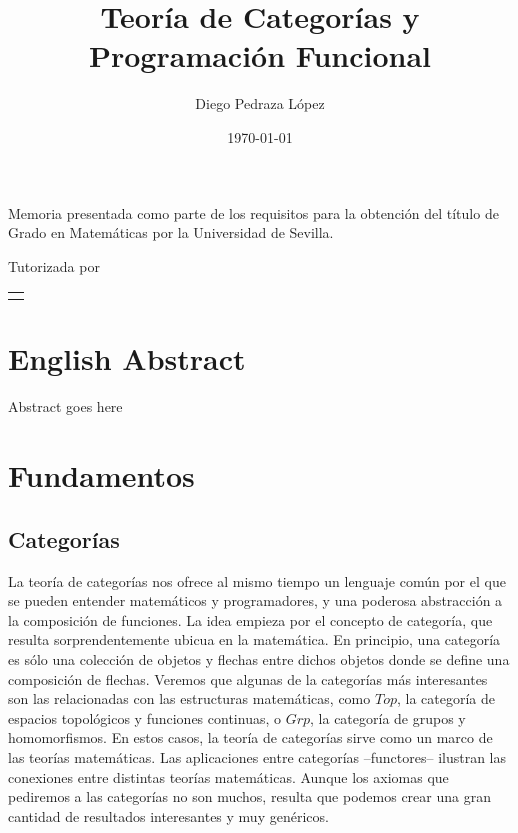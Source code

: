 \documentclass[12pt, twoside]{book}
\title{Teoría de Categorías y Programación Funcional}
\author{Diego Pedraza López}
\date{\today}
\makeatletter
\renewcommand\maketitle{%
  \begin{titlepage}
      \vspace*{1.5cm}
      \parskip=0pt
      \Huge\bfseries
      \begin{center}
          \@title
      \end{center}
      \vspace{1cm}
      \begin{center}
          \@author
      \end{center}
  \end{titlepage}

  \begin{titlepage}
  \parindent=0pt
  \begin{flushleft}
  \vspace*{1.5mm}
  \setlength\baselineskip{0pt}
  \setlength\parskip{0mm}
  \begin{center}
  \end{center}
  \end{flushleft}
  \vspace{1cm}
  \bgroup
  \Large \bfseries
  \begin{center}
  \@title
  \end{center}
  \egroup
  \vspace*{.5cm}
  \begin{center}
  \@author
  \end{center}
  \vspace*{1.8cm}
  \begin{flushright}
  \begin{minipage}{8.45cm}
      Memoria presentada como parte de los requisitos para la obtención del título de
      Grado en Matemáticas por la Universidad de Sevilla.

      \vspace*{7.5mm}

      Tutorizada por
  \end{minipage}\par
  \begin{tabularx}{8.45cm}[b]{@{}l}
      \guardatutores
  \end{tabularx}
   \end{flushright}
      \vspace*{\fill}
   \end{titlepage}
   \pagestyle{tfg}
   \renewcommand{\chaptermark}[1]{\markright{\thechapter.\space ##1}}
   \renewcommand{\sectionmark}[1]{}
   \renewcommand{\subsectionmark}[1]{}
  }
\newcommand{\Grp}{{Grp}}
\newcommand{\Top}{{Top}}
\makeatother
\begin{document}
\maketitle

\frontmatter
\tableofcontents

\mainmatter


\chapter*{English Abstract}

\begin{otherlanguage}{english}
    Abstract goes here
\end{otherlanguage}

\chapter{Fundamentos}

\section{Categorías}

La teoría de categorías nos ofrece al mismo tiempo un lenguaje común por el que se pueden entender matemáticos y programadores, y una poderosa abstracción a la composición de funciones.
La idea empieza por el concepto de categoría, que resulta sorprendentemente ubicua en la matemática.
En principio, una categoría es sólo una colección de objetos y flechas entre dichos objetos donde se define una composición de flechas.
Veremos que algunas de la categorías más interesantes son las relacionadas con las estructuras matemáticas, como $\Top$, la categoría de espacios topológicos y funciones continuas, o $\Grp$, la categoría de grupos y homomorfismos.
En estos casos, la teoría de categorías sirve como un marco de las teorías matemáticas.
Las aplicaciones entre categorías --functores-- ilustran las conexiones entre distintas teorías matemáticas.
Aunque los axiomas que pediremos a las categorías no son muchos, resulta que podemos crear una gran cantidad de resultados interesantes y muy genéricos.
\end{document}
